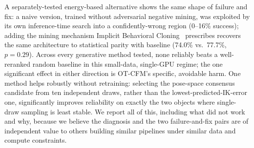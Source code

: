 \documentclass[journal]{IEEEtran}
\begin{document}
A separately-tested energy-based alternative shows the same shape of
failure and fix: a naive version, trained without adversarial negative
mining, was exploited by its own inference-time search into a
confidently-wrong region (0--16\% success); adding the mining mechanism
Implicit Behavioral Cloning~\cite{florence2021implicit} prescribes recovers
the same architecture to statistical parity with baseline (74.0\% vs.\
77.7\%, $p{=}0.29$). Across every generative method tested, none reliably
beats a well-reranked random baseline in this small-data, single-GPU
regime; the one significant effect in either direction is OT-CFM's specific,
avoidable harm. One method helps robustly without retraining: selecting the
pose-space consensus candidate from ten independent draws, rather than the
lowest-predicted-IK-error one, significantly improves reliability on
exactly the two objects where single-draw sampling is least stable. We
report all of this, including what did not work and why, because we
believe the diagnosis and the two failure-and-fix pairs are of independent
value to others building similar pipelines under similar data and compute
constraints.
\end{document}
